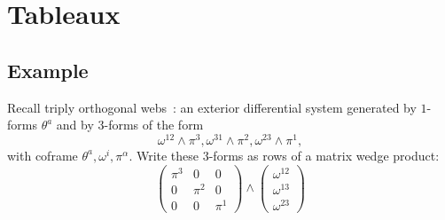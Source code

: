 \chapter{Tableaux}\label{chapter:tableaux}

\section{Example}
\begin{example}
Recall triply orthogonal webs~: an exterior differential system generated by \(1\)-forms \(\theta^a\) and by \(3\)-forms of the form
\[
\omega^{12}\wedge\pi^3, \omega^{31}\wedge\pi^2, \omega^{23}\wedge\pi^1, 
\]
with coframe \(\theta^a,\omega^i,\pi^{\alpha}\).
Write these \(3\)-forms as rows of a matrix wedge product:
\[
\begin{pmatrix}
\pi^3 & 0 & 0 \\
0 & \pi^2 & 0 \\
0 & 0 & \pi^1
\end{pmatrix}\wedge
\begin{pmatrix}
\omega^{12}\\
\omega^{13}\\ 
\omega^{23}
\end{pmatrix}
\]
\end{example}

